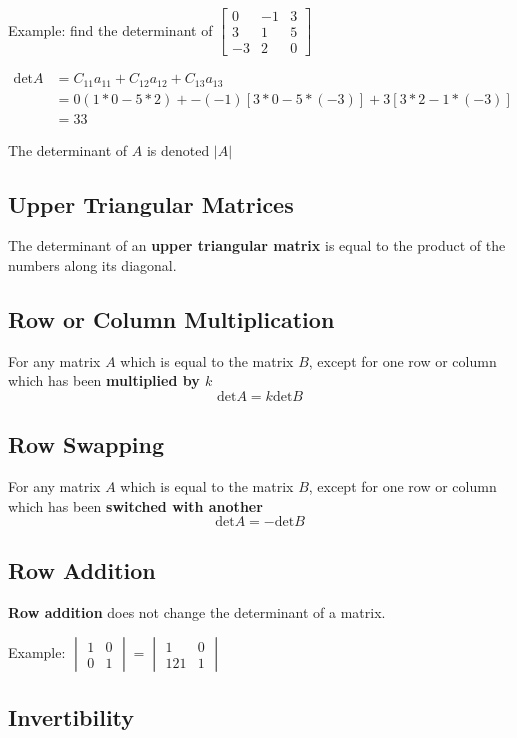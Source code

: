 \documentclass[12pt]{article}
\begin{document}
Example: find the determinant of $\begin{bmatrix}0&-1&3\\3&1&5\\-3&2&0\end{bmatrix}$

\begin{align*}
\text{det}A &= C_{11}a_{11} + C_{12}a_{12} + C_{13}a_{13}\\
&= 0(1*0-5*2) + -(-1)[3*0-5*(-3)] + 3[3*2-1*(-3)]\\
&= 33
\end{align*}

The determinant of $A$ is denoted $|A|$

\subsection*{Upper Triangular Matrices}
The determinant of an {\bf upper triangular matrix} is equal to the product of the numbers along its diagonal.

\subsection*{Row or Column Multiplication}
For any matrix $A$ which is equal to the matrix $B$, except for one row or column which has been {\bf multiplied by $k$} \[ \text{det}A = k\text{det}B \]

\subsection*{Row Swapping}
For any matrix $A$ which is equal to the matrix $B$, except for one row or column which has been {\bf switched with another} \[ \text{det}A = -\text{det}B \]

\subsection*{Row Addition}
{\bf Row addition} does not change the determinant of a matrix.

Example: $\begin{vmatrix}1&0\\0&1\end{vmatrix} = \begin{vmatrix}1&0\\121&1\end{vmatrix}$

\subsection*{Invertibility}
\end{document}
